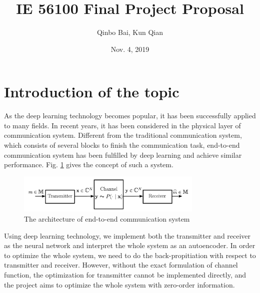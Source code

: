\documentclass[12pt,a4paper]{article}
\title{IE 56100 Final Project Proposal}
\author{Qinbo Bai, Kun Qian}
\date{Nov. 4, 2019}
\begin{document}
	\maketitle
	\section{Introduction of the topic}
	\noindent
	\par As the deep learning technology becomes popular, it has been successfully applied to many fields. In recent years, it has been considered in the physical layer of communication system. Different from the traditional communication system, which consists of several blocks to finish the communication task, end-to-end communication system has been fulfilled by deep learning and achieve similar performance. Fig. \ref{end2end} gives the concept of such a system.
	\begin{figure}[h] \label{end2end}
		\centering
		\includegraphics[width=3.5in]{end2end.png}
		\caption{The architecture of end-to-end communication system}
	\end{figure}
	\par Using deep learning technology, we implement both the transmitter and receiver as the neural network and interpret the whole system as an autoencoder. In order to optimize the whole system, we need to do the back-propitiation with respect to transmitter and receiver. However, without the exact formulation of channel function, the optimization for transmitter cannot be implemented directly, and the project aims to optimize the whole system with zero-order information.
\end{document}

